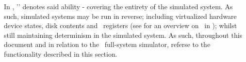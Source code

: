In \dvttermsimics , '\dvttermreverseexecution ' denotes said ability - covering the entirety of the simulated system.
As such, simulated systems may be run in reverse; including virtualized hardware device states, disk contents and \dvttermcpu\ registers (see  for an overview on \dvttermreverseexecution\ in \dvttermsimics ); whilst still maintaining determinism in the simulated system.
As such, throughout this document and in relation to the \dvttermsimics\ full-system simulator, \dvttermreverseexecution referse to the functionality described in this section.

